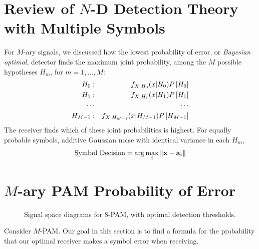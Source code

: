 





\section{Review of $N$-D Detection Theory with Multiple Symbols}

For $M$-ary signals, we discussed how the lowest probability of error, or \emph{Bayesian optimal}, detector finds the maximum joint probability, among the $M$ possible hypotheses $H_m$, for $m=1, \ldots, M$:
\begin{eqnarray}
  H_0: && f_{X|H_0}(x| H_0) P\left[{H_0}\right] \nonumber \\
  H_1: && f_{X|H_1}(x| H_1) P\left[{H_1}\right] \nonumber \\
  \cdots && \cdots \nonumber \\
  H_{M-1}: && f_{X|H_{M-1}}(x| H_{M-1}) P\left[{H_{M-1}}\right] \nonumber
\end{eqnarray}
The receiver finds which of these joint probabilities is highest.  For equally probable
symbols, additive Gaussian noise with identical variance in each $H_m$,
\[
  \mbox{Symbol Decision} = \arg \max_i \| \mathbf{x} - \mathbf{a}_i \|
\]


\section{$M$-ary PAM Probability of Error}

\begin{figure}[htbp]
  \centerline{ }
  \caption{Signal space diagrams for 8-PAM, with optimal detection thresholds.}
  \label{F:8PAM_detection_thresholds}
\end{figure}

Consider $M$-PAM.  Our goal in this section is to find a formula for the probability that our optimal receiver makes a symbol error when receiving.

